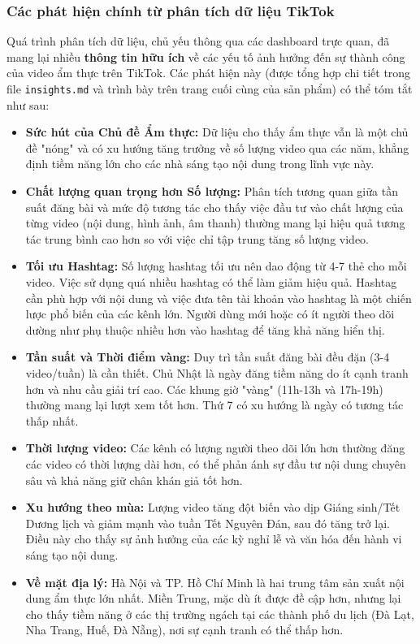 \subsubsection{Các phát hiện chính từ phân tích dữ liệu TikTok}

Quá trình phân tích dữ liệu, chủ yếu thông qua các dashboard trực quan, đã mang lại nhiều \textbf{thông tin hữu ích} về các yếu tố ảnh hưởng đến sự thành công của video ẩm thực trên TikTok. Các phát hiện này (được tổng hợp chi tiết trong file \texttt{insights.md} và trình bày trên trang cuối cùng của sản phẩm) có thể tóm tắt như sau:
\begin{itemize}
    \item \textbf{Sức hút của Chủ đề Ẩm thực:} Dữ liệu cho thấy ẩm thực vẫn là một chủ đề "nóng" và có xu hướng tăng trưởng về số lượng video qua các năm, khẳng định tiềm năng lớn cho các nhà sáng tạo nội dung trong lĩnh vực này.

    \item \textbf{Chất lượng quan trọng hơn Số lượng:} Phân tích tương quan giữa tần suất đăng bài và mức độ tương tác cho thấy việc đầu tư vào chất lượng của từng video (nội dung, hình ảnh, âm thanh) thường mang lại hiệu quả tương tác trung bình cao hơn so với việc chỉ tập trung tăng số lượng video.
    
    \item \textbf{Tối ưu Hashtag:} Số lượng hashtag tối ưu nên dao động từ 4-7 thẻ cho mỗi video. Việc sử dụng quá nhiều hashtag có thể làm giảm hiệu quả. Hashtag cần phù hợp với nội dung và việc đưa tên tài khoản vào hashtag là một chiến lược phổ biến của các kênh lớn. Người dùng mới hoặc có ít người theo dõi dường như phụ thuộc nhiều hơn vào hashtag để tăng khả năng hiển thị.
    
    \item \textbf{Tần suất và Thời điểm vàng:} Duy trì tần suất đăng bài đều đặn (3-4 video/tuần) là cần thiết. Chủ Nhật là ngày đăng tiềm năng do ít cạnh tranh hơn và nhu cầu giải trí cao. Các khung giờ "vàng" (11h-13h và 17h-19h) thường mang lại lượt xem tốt hơn. Thứ 7 có xu hướng là ngày có tương tác thấp nhất.
    
    \item \textbf{Thời lượng video:} Các kênh có lượng người theo dõi lớn hơn thường đăng các video có thời lượng dài hơn, có thể phản ánh sự đầu tư nội dung chuyên sâu và khả năng giữ chân khán giả tốt hơn.
    
    \item \textbf{Xu hướng theo mùa:} Lượng video tăng đột biến vào dịp Giáng sinh/Tết Dương lịch và giảm mạnh vào tuần Tết Nguyên Đán, sau đó tăng trở lại. Điều này cho thấy sự ảnh hưởng của các kỳ nghỉ lễ và văn hóa đến hành vi sáng tạo nội dung.
    
    \item \textbf{Về mặt địa lý:} Hà Nội và TP. Hồ Chí Minh là hai trung tâm sản xuất nội dung ẩm thực lớn nhất. Miền Trung, mặc dù ít được đề cập hơn, nhưng lại cho thấy tiềm năng ở các thị trường ngách tại các thành phố du lịch (Đà Lạt, Nha Trang, Huế, Đà Nẵng), nơi sự cạnh tranh có thể thấp hơn.
\end{itemize}

